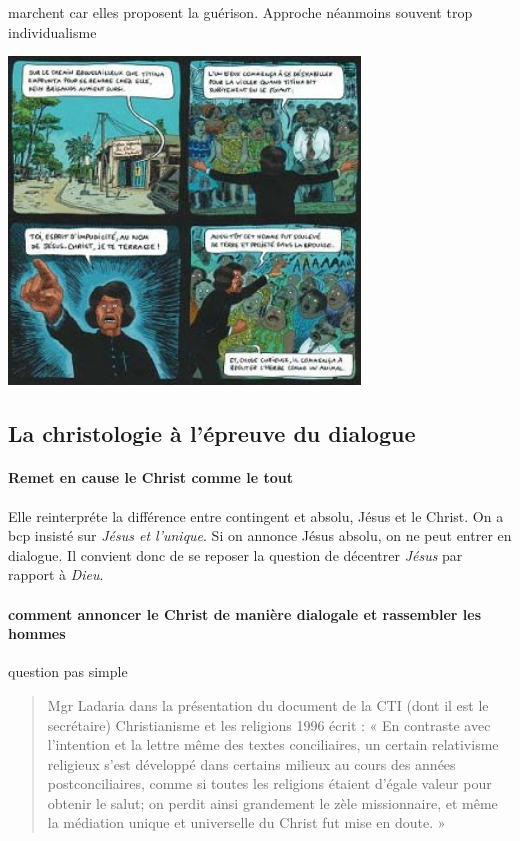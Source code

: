 \begin{Ex}
    marchent car elles proposent la guérison. 
    Approche néanmoins souvent trop individualisme

    \includegraphics[width=0.7\textwidth]{ChristologiePluraliste/Images/Aya.jpg}
\end{Ex}

\subsection{La christologie à l’épreuve du dialogue}

\paragraph{Remet en cause le Christ comme le tout} Elle reinterpréte la différence entre contingent et absolu, Jésus et le Christ. On a bcp insisté sur \textit{Jésus et l'unique}. Si on annonce Jésus absolu, on ne peut entrer en dialogue. Il convient donc de se reposer la question de décentrer \textit{Jésus} par rapport à \textit{Dieu}. 

\paragraph{comment annoncer le Christ de manière dialogale et rassembler les hommes} question pas simple 
\begin{quote}
    Mgr Ladaria dans la présentation du document de la CTI (dont il est le secrétaire)
Christianisme et les religions 1996 écrit : « En contraste avec l’intention et la lettre même des textes conciliaires, un certain relativisme religieux s’est développé dans certains milieux au cours des années postconciliaires, comme si toutes les religions étaient d’égale valeur pour obtenir le salut; on perdit ainsi grandement le zèle missionnaire, et même la médiation unique
et universelle du Christ fut mise en doute. »
\end{quote}




